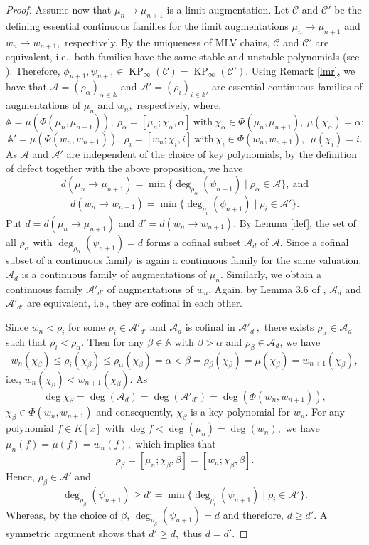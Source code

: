 \documentclass[11pt]{amsart}
\theoremstyle{definition}
\theoremstyle{remark}
\numberwithin{equation}{section}
\begin{document}
\begin{proof}
  	Assume now that  $\mu_n\longrightarrow \mu_{n+1}$ is a limit augmentation. Let $\mathcal{C}$ and $\mathcal{C}'$ be the defining essential continuous families for the limit augmentations $\mu_n\longrightarrow \mu_{n+1}$ and  $w_n\longrightarrow w_{n+1},$ respectively. By the uniqueness of MLV chains, $\mathcal{C}$ and $\mathcal{C}'$ are equivalent, i.e., both families have the same stable and unstable polynomials (see \cite[Lemma 3.6]{EN1}). Therefore, $\phi_{n+1},\psi_{n+1}\in\operatorname{KP}_{\infty}(\mathcal{C})=\operatorname{KP}_{\infty}(\mathcal{C}').$ Using Remark \ref{lmr}, we have that  $\mathcal{A}=(\rho_{\alpha})_{\alpha\in\mathbb{A}}$ and $\mathcal{A}'=(\rho_{i})_{i\in\mathbb{A}'}$ are essential continuous families of augmentations of $\mu_n$ and $w_n,$ respectively, where, \[\mathbb{A}=\mu(\Phi(\mu_n,\mu_{n+1})),\   \rho_\alpha=[\mu_n;\chi_\alpha,\alpha]\  \text{with}\  \chi_\alpha\in\Phi(\mu_n,\mu_{n+1}),\ \mu(\chi_\alpha)=\alpha;\] \[ \mathbb{A}'=\mu(\Phi(w_n,w_{n+1})),\ \rho_i=[w_n;\chi_i,i]\ \text{with}\ \chi_i\in\Phi(w_n,w_{n+1}),\ \ \mu(\chi_i)=i.\]  As $\mathcal{A}$ and $\mathcal{A}'$ are independent of the choice of key polynomials, by the definition of defect together with the above proposition, we have
  	\[d(\mu_n\longrightarrow \mu_{n+1})=\min\{\deg_{\rho_\alpha}(\psi_{n+1}) \mid \rho_\alpha\in \mathcal{A}\},\ \text{and}\] 
  	\[d(w_n\longrightarrow w_{n+1})=\min\{\deg_{\rho_i}(\phi_{n+1}) \mid \rho_i\in \mathcal{A}'\}.\] Put $d=d(\mu_n\longrightarrow \mu_{n+1})$ and $d'=d(w_n\longrightarrow w_{n+1})$. By Lemma \ref{def}, the set of all $\rho_\alpha$ with $\deg_{\rho_\alpha}(\psi_{n+1})=d$ forms a cofinal subset $\mathcal{A}_d$ of $\mathcal{A}$.  Since a cofinal subset of a continuous family is again a continuous family for the same valuation, $\mathcal{A}_d$ is a continuous family of augmentations of $\mu_n.$ Similarly, we obtain a continuous family $\mathcal{A}'_{d'}$ of augmentations of $w_n.$ Again, by Lemma 3.6 of \cite{EN1}, $\mathcal{A}_d$ and $\mathcal{A}'_{d'}$ are equivalent, i.e., they are cofinal in each other. 
  	
  	Since $w_n<\rho_i$ for some $\rho_i\in\mathcal{A}'_{d'}$ and $\mathcal{A}_d$ is cofinal in $\mathcal{A}'_{d'},$ there exists $\rho_\alpha\in\mathcal{A}_d$ such that $\rho_i<\rho_\alpha$. Then for any $\beta\in \mathbb{A}$ with $\beta>\alpha$ and $\rho_\beta\in\mathcal{A}_d$, we have \[w_n(\chi_\beta)\leq \rho_i(\chi_\beta)\leq\rho_\alpha(\chi_\beta)=\alpha<\beta=\rho_\beta(\chi_\beta)=\mu(\chi_\beta)=w_{n+1}(\chi_\beta),\] i.e., $w_n(\chi_\beta)<w_{n+1}(\chi_\beta).$ As \[\deg\chi_\beta=\deg(\mathcal{A}_d)=\deg(\mathcal{A}'_{d'})=\deg(\Phi(w_n,w_{n+1})),\] $\chi_\beta\in\Phi(w_n,w_{n+1})$ and consequently, $\chi_\beta$ is a key polynomial for $w_n.$ For any polynomial $f\in K[x]$ with $\deg f<\deg(\mu_n)=\deg(w_n),$ we have $\mu_n(f)=\mu(f)=w_n(f),$ which implies that  \[\rho_\beta=[\mu_n;\chi_\beta,\beta]=[w_n;\chi_\beta,\beta].\] Hence, $\rho_\beta\in\mathcal{A}'$ and \[\deg_{\rho_\beta}(\psi_{n+1})\geq d'=\min\{\deg_{\rho_i}(\psi_{n+1})\mid \rho_i\in\mathcal{A}'\}.\] Whereas, by the choice of $\beta$, $\deg_{\rho_\beta}(\psi_{n+1})=d$ and therefore,  $d\geq d'.$ A symmetric argument shows that $d'\geq d,$ thus $d=d'$.
   \end{proof}
 
\end{document}
